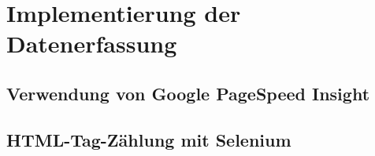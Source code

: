 \section{Implementierung der Datenerfassung}
\label{sec:implementierung_der_datenerfassung}


\subsection{Verwendung von Google PageSpeed Insight}
\label{sec:verwendung_von_google_pagespeed_insight}


\subsection{HTML-Tag-Zählung mit Selenium}
\label{sec:tagzahlung_von_selenium}


